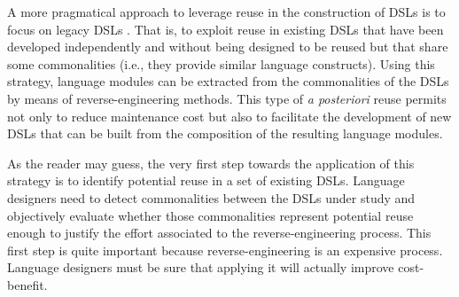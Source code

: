 A more pragmatical approach to leverage reuse in the construction of DSLs is to focus on legacy DSLs \cite{degueule:2015}. That is, to exploit reuse in existing DSLs that have been developed independently and without being designed to be reused but that share some commonalities (i.e., they provide similar language constructs). Using this strategy, language modules can be extracted from the commonalities of the DSLs by means of reverse-engineering methods. This type of \textit{a posteriori} reuse permits not only to reduce maintenance cost but also to facilitate the development of new DSLs that can be built from the composition of the resulting language modules.

As the reader may guess, the very first step towards the application of this strategy is to identify potential reuse in a set of existing DSLs. Language designers need to detect commonalities between the DSLs under study and objectively evaluate whether those commonalities represent potential reuse enough to justify the effort associated to the reverse-engineering process. This first step is quite important because reverse-engineering is an expensive process. Language designers must be sure that applying it will actually improve cost-benefit. 



